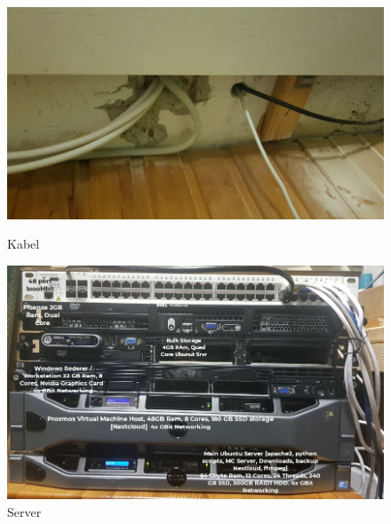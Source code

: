 \begin{figure}[h]
    \begin{minipage}{.42\linewidth}
        \includegraphics[width=\linewidth]{assets/1.jpg}
        \caption{Kabel}
        \label{fig:kabel}
    \end{minipage}
    \hfill
    \begin{minipage}{.42\linewidth}
        \includegraphics[width=\linewidth]{assets/2.jpg}
        \caption{Server}
        \label{fig:server}
    \end{minipage}
    \centering
     {
        \begin{minipage}{.42\linewidth}

\end{minipage}}
\end{figure}
